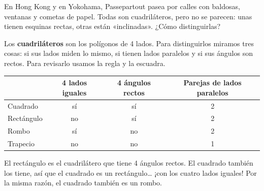 \documentclass[11pt]{article}
\begin{document}
\label{tema:cuadrilateros}

\begin{hilo}
En Hong Kong y en Yokohama, Passepartout pasea por calles con baldosas,
ventanas y cometas de papel. Todas son cuadriláteros, pero no se parecen:
unas tienen esquinas rectas, otras están «inclinadas». ¿Cómo distinguirlas?
\end{hilo}

Los \textbf{cuadriláteros} son los polígonos de 4 lados. Para distinguirlos
miramos tres cosas: si sus lados miden lo mismo, si tienen lados paralelos y
si sus ángulos son rectos. Para revisarlo usamos la regla y la escuadra.

\begin{center}
\end{center}

\begin{center}
{\renewcommand{\arraystretch}{1.4}
\begin{tabular}{|l|c|c|c|}
  \hline
  & \textbf{4 lados iguales} & \textbf{4 ángulos rectos} & \textbf{Parejas de lados paralelos}\\\hline
  Cuadrado   & sí & sí & 2\\\hline
  Rectángulo & no & sí & 2\\\hline
  Rombo      & sí & no & 2\\\hline
  Trapecio   & no & no & 1\\\hline
\end{tabular}}
\end{center}

\begin{ejemplo}
El rectángulo es el cuadrilátero que tiene 4 ángulos rectos. El cuadrado
también los tiene, así que el cuadrado es un rectángulo… ¡con los cuatro
lados iguales! Por la misma razón, el cuadrado también es un rombo.
\end{ejemplo}
\end{document}
